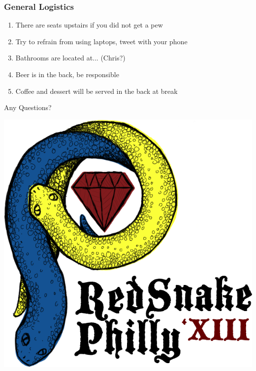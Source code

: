 \documentclass[xcolor=dvipsnames,red]{beamer}
\begin{document}
\begin{frame}
\frametitle{General Logistics}
\begin{enumerate}
\item There are seats upstairs if you did not get a pew
\item Try to refrain from using laptops, tweet with your phone
\item Bathrooms are located at... (Chris?)
\item Beer is in the back, be responsible
\item Coffee and dessert will be served in the back at break
\end{enumerate}

Any Questions?
\end{frame}

\begin{frame}[plain]
\begin{center}
\includegraphics[width=.75\textwidth]{imgs/redsnakephilly2013logo.png}
\end{center}
\end{frame}
\end{document}

